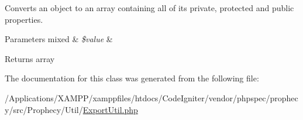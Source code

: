 Converts an object to an array containing all of its private, protected and public properties.


\begin{DoxyParams}[1]{Parameters}
mixed & {\em \$value} & \\
\hline
\end{DoxyParams}
\begin{DoxyReturn}{Returns}
array 
\end{DoxyReturn}


The documentation for this class was generated from the following file\+:\begin{DoxyCompactItemize}
\item 
/\+Applications/\+X\+A\+M\+P\+P/xamppfiles/htdocs/\+Code\+Igniter/vendor/phpspec/prophecy/src/\+Prophecy/\+Util/\mbox{\hyperlink{_export_util_8php}{Export\+Util.\+php}}\end{DoxyCompactItemize}
